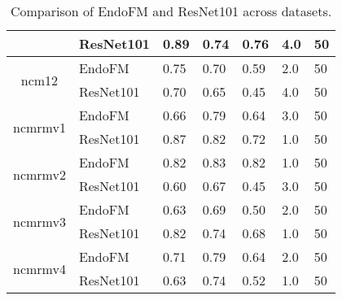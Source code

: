 \begin{table}[h]
\begin{tabular}{cllllll}
     & ResNet101 & 0.89 & 0.74 & 0.76 & 4.0 & 50 \\
    \midrule
    \multirow{2}{*}{ncm12}
 & EndoFM & 0.75 & 0.70 & 0.59 & 2.0 & 50 \\
     & ResNet101 & 0.70 & 0.65 & 0.45 & 4.0 & 50 \\
    \midrule
    \multirow{2}{*}{ncmrmv1}
 & EndoFM & 0.66 & 0.79 & 0.64 & 3.0 & 50 \\
     & ResNet101 & 0.87 & 0.82 & 0.72 & 1.0 & 50 \\
    \midrule
    \multirow{2}{*}{ncmrmv2}
 & EndoFM & 0.82 & 0.83 & 0.82 & 1.0 & 50 \\
     & ResNet101 & 0.60 & 0.67 & 0.45 & 3.0 & 50 \\
    \midrule
    \multirow{2}{*}{ncmrmv3}
 & EndoFM & 0.63 & 0.69 & 0.50 & 2.0 & 50 \\
     & ResNet101 & 0.82 & 0.74 & 0.68 & 1.0 & 50 \\
    \midrule
    \multirow{2}{*}{ncmrmv4}
 & EndoFM & 0.71 & 0.79 & 0.64 & 2.0 & 50 \\
     & ResNet101 & 0.63 & 0.74 & 0.52 & 1.0 & 50 \\
    \midrule
    \bottomrule
    \end{tabular}
    \vspace{-0.1in}
    \caption{Comparison of EndoFM and ResNet101 across datasets.}
    \label{tab:performance_comparison}
\end{table}
